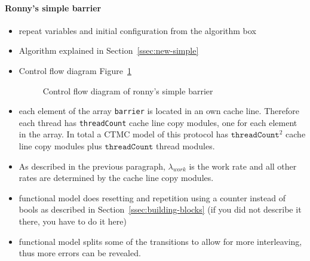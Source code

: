 \documentclass[a4paper, 10pt]{article}
\begin{document}
\paragraph{Ronny's simple barrier}
\label{ssssec:analysis-modelchecking-modelling-ronny-simple}
\begin{itemize}
	\item repeat variables and initial configuration from the algorithm box
	\item Algorithm explained in Section~\ref{ssec:new-simple}
	\item Control flow diagram Figure~\ref{fig:model-ronny-simple}
		\begin{figure}[htbp]
			\centering
			
			\caption{Control flow diagram of ronny's simple barrier}
			\label{fig:model-ronny-simple}
		\end{figure}
	\item each element of the array \texttt{barrier} is located in an own cache line. Therefore each thread has \texttt{threadCount} cache line copy modules, one for each element in the array. In total a CTMC model of this protocol has $\mathtt{threadCount}^2$ cache line copy modules plus $\mathtt{threadCount}$ thread modules.
	\item As described in the previous paragraph, $\lambda_{work}$ is the work rate and all other rates are determined by the cache line copy modules.
	\item functional model does resetting and repetition using a counter instead of bools as described in Section~\ref{ssec:building-blocks} (if you did not describe it there, you have to do it here)
	\item functional model splits some of the transitions to allow for more interleaving, thus more errors can be revealed.
\end{itemize}

\end{document}
